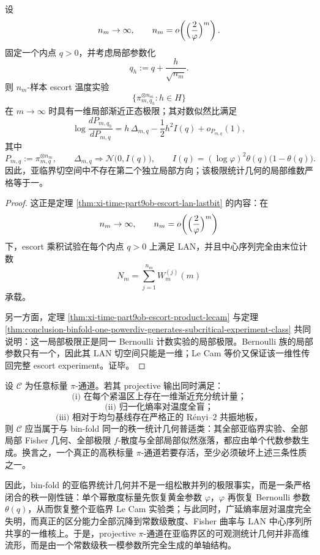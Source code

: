 \begin{theorem}[亚临界局部渐近正态性与切空间唯一化]\label{thm:conclusion-binfold-subcritical-lan-unique-tangent}
设
\[
n_m\to\infty,
\qquad
n_m=o\!\left(\Bigl(\frac{2}{\varphi}\Bigr)^m\right).
\]
固定一个内点 \(q>0\)，并考虑局部参数化
\[
q_h:=q+\frac{h}{\sqrt{n_m}}.
\]
则 \(n_m\)-样本 escort 温度实验
\[
\{\pi_{m,q_h}^{\otimes n_m}:h\in H\}
\]
在 \(m\to\infty\) 时具有一维局部渐近正态极限；其对数似然比满足
\[
\log\frac{dP_{m,q_h}}{dP_{m,q}}
=
h\,\Delta_{m,q}
-\frac12 h^2 I(q)
+o_{P_{m,q}}(1),
\]
其中
\[
P_{m,q}:=\pi_{m,q}^{\otimes n_m},
\qquad
\Delta_{m,q}\Rightarrow \mathcal N\!\bigl(0,I(q)\bigr),
\qquad
I(q)=(\log\varphi)^2\theta(q)\bigl(1-\theta(q)\bigr).
\]
因此，亚临界切空间中不存在第二个独立局部方向；该极限统计几何的局部维数严格等于一。
\end{theorem}
\begin{proof}
这正是定理 \ref{thm:xi-time-part9ob-escort-lan-lastbit} 的内容：在
\[
n_m\to\infty,
\qquad
n_m=o\!\left(\Bigl(\frac{2}{\varphi}\Bigr)^m\right)
\]
下，escort 乘积试验在每个内点 \(q>0\) 上满足 LAN，并且中心序列完全由末位计数
\[
N_m=\sum_{j=1}^{n_m}W_m^{(j)}(m)
\]
承载。

另一方面，定理 \ref{thm:xi-time-part9ob-escort-product-lecam} 与定理 \ref{thm:conclusion-binfold-one-powerdiv-generates-subcritical-experiment-class} 共同说明：这一局部极限正是同一 Bernoulli 计数实验的局部极限。Bernoulli 族的局部参数只有一个，因此其 LAN 切空间只能是一维；Le Cam 等价又保证该一维性传回完整 escort experiment。证毕。
\end{proof}

\begin{conjecture}\label{conj:conclusion-rankone-universality-scalar-pi-channel}
设 \(\mathcal C\) 为任意标量 \(\pi\)-通道。若其 projective 输出同时满足：
\[
\text{(i) 在每个紧温区上存在一维渐近充分统计量；}
\]
\[
\text{(ii) 归一化熵率对温度全盲；}
\]
\[
\text{(iii) 相对于均匀基线存在严格正的 Rényi--2 共振地板，}
\]
则 \(\mathcal C\) 应当属于与 bin-fold 同一的秩一统计几何普适类：其全部亚临界实验、全部局部 Fisher 几何、全部极限 \(f\)-散度与全部局部似然涨落，都应由单个代数参数生成。换言之，一个真正的高秩标量 \(\pi\)-通道若要存活，至少必须破坏上述三条性质之一。
\end{conjecture}

\noindent
因此，bin-fold 的亚临界统计几何并不是一组松散并列的极限事实，而是一条严格闭合的秩一刚性链：单个幂散度标量先恢复黄金参数 \(\varphi\)，\(\varphi\) 再恢复 Bernoulli 参数 \(\theta(q)\)，从而恢复整个亚临界 Le Cam 实验类；与此同时，广延熵率层对温度完全失明，而真正的区分能力全部沉降到常数级散度、Fisher 曲率与 LAN 中心序列所共享的一维核上。于是，projective \(\pi\)-通道在亚临界区的可观测统计几何并非高维流形，而是由一个常数级秩一模参数所完全生成的单轴结构。

\endinput
